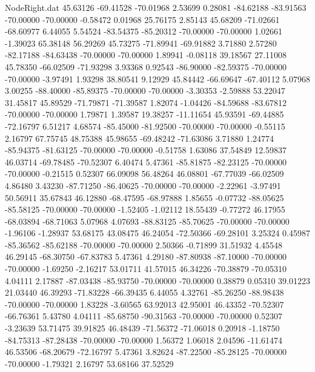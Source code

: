 \begin{filecontents}{NodeRight.dat}
  45.63126  -69.41528  -70.01968     2.53699    0.28081  -84.62188  -83.91563  -70.00000  -70.00000   -0.58472    0.01968   25.76175    2.85143
  45.68209  -71.02661  -68.60977     6.44055    5.54524  -83.54375  -85.20312  -70.00000  -70.00000    1.02661   -1.39023   65.38148   56.29269
  45.73275  -71.89941  -69.91882     3.71880    2.57280  -82.17188  -84.63438  -70.00000  -70.00000    1.89941   -0.08118   39.18567   27.11008
  45.78350  -66.02509  -71.93298     3.93368    0.92543  -86.90000  -82.59375  -70.00000  -70.00000   -3.97491    1.93298   38.80541    9.12929
  45.84442  -66.69647  -67.40112     5.07968    3.00255  -88.40000  -85.89375  -70.00000  -70.00000   -3.30353   -2.59888   53.22047   31.45817
  45.89529  -71.79871  -71.39587     1.82074   -1.04426  -84.59688  -83.67812  -70.00000  -70.00000    1.79871    1.39587   19.38257  -11.11654
  45.93591  -69.44885  -72.16797     6.51217    4.68574  -85.45000  -81.92500  -70.00000  -70.00000   -0.55115    2.16797   67.75745   48.75388
  45.98655  -69.48242  -71.63086     3.71880    1.24774  -85.94375  -81.63125  -70.00000  -70.00000   -0.51758    1.63086   37.54849   12.59837
  46.03714  -69.78485  -70.52307     6.40474    5.47361  -85.81875  -82.23125  -70.00000  -70.00000   -0.21515    0.52307   66.09098   56.48264
  46.08801  -67.77039  -66.02509     4.86480    3.43230  -87.71250  -86.40625  -70.00000  -70.00000   -2.22961   -3.97491   50.56911   35.67843
  46.12880  -68.47595  -68.97888     1.85655   -0.07732  -88.05625  -85.58125  -70.00000  -70.00000   -1.52405   -1.02112   18.55439   -0.77272
  46.17955  -68.03894  -68.71063     5.07968    4.07693  -88.83125  -85.70625  -70.00000  -70.00000   -1.96106   -1.28937   53.68175   43.08475
  46.24054  -72.50366  -69.28101     3.25324    0.45987  -85.36562  -85.62188  -70.00000  -70.00000    2.50366   -0.71899   31.51932    4.45548
  46.29145  -68.30750  -67.83783     5.47361    4.29180  -87.80938  -87.10000  -70.00000  -70.00000   -1.69250   -2.16217   53.01711   41.57015
  46.34226  -70.38879  -70.05310     4.04111    2.17887  -87.03438  -85.93750  -70.00000  -70.00000    0.38879    0.05310   39.01223   21.03440
  46.39293  -71.83228  -66.39435     6.44055    4.32761  -85.26250  -88.98438  -70.00000  -70.00000    1.83228   -3.60565   63.92013   42.95001
  46.43352  -70.52307  -66.76361     5.43780    4.04111  -85.68750  -90.31563  -70.00000  -70.00000    0.52307   -3.23639   53.71475   39.91825
  46.48439  -71.56372  -71.06018     0.20918   -1.18750  -84.75313  -87.28438  -70.00000  -70.00000    1.56372    1.06018    2.04596  -11.61474
  46.53506  -68.20679  -72.16797     5.47361    3.82624  -87.22500  -85.28125  -70.00000  -70.00000   -1.79321    2.16797   53.68166   37.52529

\end{filecontents}
